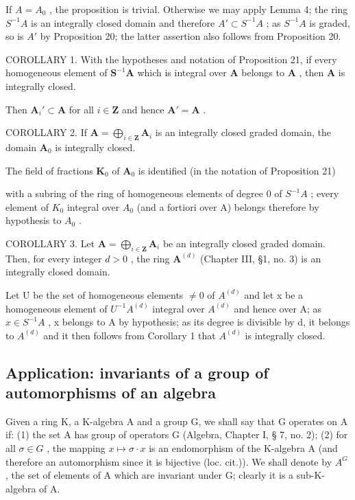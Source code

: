 If \(A = A_{0}\) , the proposition is trivial. Otherwise we may apply Lemma 4; the ring \(S^{-1}A\) is an integrally closed domain and therefore \(A' \subset S^{-1}A\) ; as \(S^{-1}A\) is graded, so is \(A'\) by Proposition 20; the latter assertion also follows from Proposition 20.

COROLLARY 1. With the hypotheses and notation of Proposition 21, if every homogeneous element of \(\mathbf{S}^{-1}\mathbf{A}\) which is integral over \(\mathbf{A}\) belongs to \(\mathbf{A}\) , then \(\mathbf{A}\) is integrally closed.

Then \(\mathbf{A}_i' \subset \mathbf{A}\) for all \(i \in \mathbf{Z}\) and hence \(\mathbf{A}' = \mathbf{A}\) .

COROLLARY 2. If \(\mathbf{A} = \bigoplus_{i\in \mathbf{Z}}\mathbf{A}_i\) is an integrally closed graded domain, the domain \(\mathbf{A}_0\) is integrally closed.

The field of fractions \(\mathbf{K}_0\) of \(\mathbf{A}_0\) is identified (in the notation of Proposition 21)

with a subring of the ring of homogeneous elements of degree 0 of \(S^{-1}A\) ; every element of \(K_{0}\) integral over \(A_{0}\) (and a fortiori over A) belongs therefore by hypothesis to \(A_{0}\) .

COROLLARY 3. Let \(\mathbf{A} = \bigoplus_{i\in \mathbf{Z}}\mathbf{A}_i\) be an integrally closed graded domain. Then, for every integer \(d > 0\) , the ring \(\mathbf{A}^{(d)}\) (Chapter III, §1, no. 3) is an integrally closed domain.

Let U be the set of homogeneous elements \(\neq0\) of \(A^{(d)}\) and let x be a homogeneous element of \(U^{-1}A^{(d)}\) integral over \(A^{(d)}\) and hence over A; as \(x\in S^{-1}A\) , x belongs to A by hypothesis; as its degree is divisible by d, it belongs to \(A^{(d)}\) and it then follows from Corollary 1 that \(A^{(d)}\) is integrally closed.

\subsection{Application: invariants of a group of automorphisms of an algebra}

Given a ring K, a K-algebra A and a group G, we shall say that G operates on A if: (1) the set A has group of operators G (Algebra, Chapter I, § 7, no. 2); (2) for all \(\sigma \in G\) , the mapping \(x \mapsto \sigma \cdot x\) is an endomorphism of the K-algebra A (and therefore an automorphism since it is bijective (loc. cit.)). We shall denote by \(A^{G}\) , the set of elements of A which are invariant under G; clearly it is a sub-K-algebra of A.

